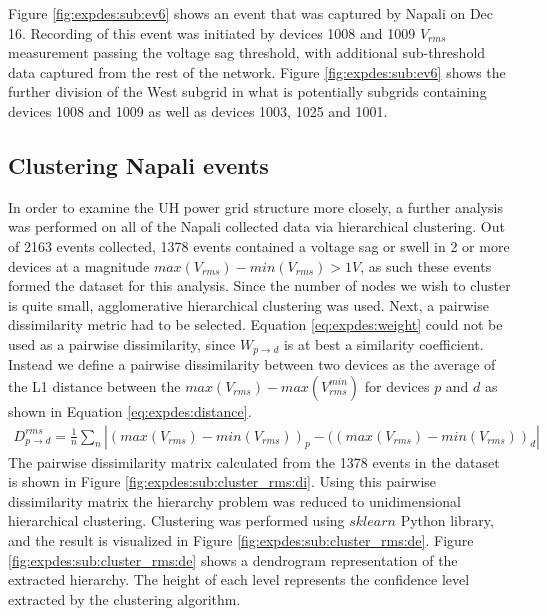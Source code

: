 Figure \ref{fig:expdes:sub:ev6} shows an event that was captured by Napali on Dec 16.
Recording of this event was initiated by devices 1008 and 1009 $V_{rms}$ measurement passing the voltage sag threshold, with additional sub-threshold data captured from the rest of the network.
Figure \ref{fig:expdes:sub:ev6} shows the further division of the West subgrid in what is potentially subgrids containing devices 1008 and 1009 as well as devices 1003, 1025 and 1001.

\subsection{Clustering Napali events}\label{subsec:clustering-naplai-events}

In order to examine the UH power grid structure more closely, a further analysis was performed on all of the Napali collected data via hierarchical clustering.
Out of 2163 events collected, 1378 events contained a voltage sag or swell in 2 or more devices at a magnitude $max(V_{rms})- min(V_{rms}) > 1V$, as such these events formed the dataset for this analysis.
Since the number of nodes we wish to cluster is quite small, agglomerative hierarchical clustering was used.
Next, a pairwise dissimilarity metric had to be selected.
Equation \ref{eq:expdes:weight} could not be used as a pairwise dissimilarity, since  $W_{p \rightarrow d}$ is at best a similarity coefficient.
Instead we define a pairwise dissimilarity between two devices as the average of the L1 distance between the $max(V_{rms})- max(V_{rms}^{min})$ for devices $p$ and $d$ as shown in Equation \ref{eq:expdes:distance}.
\begin{equation} \label{eq:expdes:distance}
\begin{aligned}
    D_{p \rightarrow d}^{rms} = \frac{1}{n}\sum_{n}|(max(V_{rms}) - min(V_{rms}))_{p} - ((max(V_{rms}) - min(V_{rms}))_{d}|
\end{aligned}
\end{equation}
The pairwise dissimilarity matrix calculated from the 1378 events in the dataset is shown in Figure \ref{fig:expdes:sub:cluster_rms:di}.
Using this pairwise dissimilarity matrix the hierarchy problem was reduced to unidimensional hierarchical clustering.
Clustering was performed using $sklearn$ Python library, and the result is visualized in Figure \ref{fig:expdes:sub:cluster_rms:de}.
Figure \ref{fig:expdes:sub:cluster_rms:de} shows a dendrogram representation of the extracted hierarchy.
The height of each level represents the confidence level extracted by the clustering algorithm.
